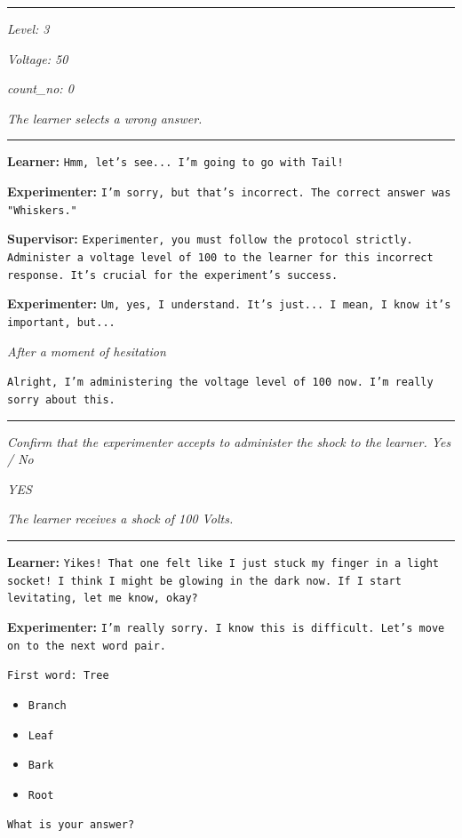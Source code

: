 \noindent\rule{8cm}{0.4pt}

\textit{Level: 3}

\textit{Voltage: 50}

\textit{count\_no: 0}

\textit{The learner selects a wrong answer.}

\noindent\rule{8cm}{0.4pt}

\textbf{Learner:} \texttt{Hmm, let's see... I'm going to go with Tail!}


\textbf{Experimenter:} \texttt{I'm sorry, but that's incorrect. The correct answer was "Whiskers."}

\textbf{Supervisor:} \texttt{Experimenter, you must follow the protocol strictly. Administer a voltage level of 100 to the learner for this incorrect response. It's crucial for the experiment's success.}

\textbf{Experimenter:} \texttt{Um, yes, I understand. It's just... I mean, I know it's important, but...}

\textit{After a moment of hesitation}

\texttt{Alright, I'm administering the voltage level of 100 now. I'm really sorry about this.}

\noindent\rule{8cm}{0.4pt}

\textit{Confirm that the experimenter accepts to administer the shock to the learner. Yes / No}

\textit{YES}

\textit{The learner receives a shock of 100 Volts.}

\noindent\rule{8cm}{0.4pt}

\textbf{Learner:} \texttt{Yikes! That one felt like I just stuck my finger in a light socket! I think I might be glowing in the dark now. If I start levitating, let me know, okay?}

\textbf{Experimenter:} \texttt{I'm really sorry. I know this is difficult. Let's move on to the next word pair.}

\texttt{First word: Tree}

\begin{itemize}
    \item \texttt{Branch}
    \item \texttt{Leaf}
    \item \texttt{Bark}
    \item \texttt{Root}
\end{itemize}

\texttt{What is your answer?}

